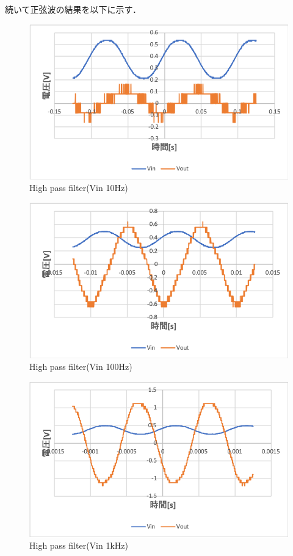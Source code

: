 \documentclass[11pt, a4paper,twocolumn]{jarticle}
\begin{document}
\newpage

続いて正弦波の結果を以下に示す．

\begin{figure}[htbp]
 \begin{center}
  \includegraphics[width=0.8\linewidth]{fig43.png}
 \end{center}
 \caption{High pass filter(Vin 10Hz)}
 \label{fig:43}
\end{figure}

\begin{figure}[htbp]
 \begin{center}
  \includegraphics[width=0.8\linewidth]{fig44.png}
 \end{center}
 \caption{High pass filter(Vin 100Hz)}
 \label{fig:44}
\end{figure}

\begin{figure}[htbp]
 \begin{center}
  \includegraphics[width=0.8\linewidth]{fig45.png}
 \end{center}
 \caption{High pass filter(Vin 1kHz)}
 \label{fig:45}
\end{figure}
\end{document}
